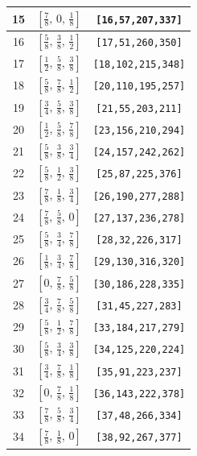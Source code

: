 \documentclass[fleqn,8pt]{jsarticle}
\begin{document}
\begin{longtable}{ccc}
15 & $\left[ \frac{7}{8},\, 0,\, \frac{1}{8} \right]$ & {\tt [16,57,207,337]} \\ \hline
16 & $\left[ \frac{5}{8},\, \frac{3}{8},\, \frac{1}{2} \right]$ & {\tt [17,51,260,350]} \\ \hline
17 & $\left[ \frac{1}{2},\, \frac{5}{8},\, \frac{3}{8} \right]$ & {\tt [18,102,215,348]} \\ \hline
18 & $\left[ \frac{5}{8},\, \frac{7}{8},\, \frac{1}{2} \right]$ & {\tt [20,110,195,257]} \\ \hline
19 & $\left[ \frac{3}{4},\, \frac{5}{8},\, \frac{3}{8} \right]$ & {\tt [21,55,203,211]} \\ \hline
20 & $\left[ \frac{1}{2},\, \frac{5}{8},\, \frac{7}{8} \right]$ & {\tt [23,156,210,294]} \\ \hline
21 & $\left[ \frac{5}{8},\, \frac{3}{8},\, \frac{3}{4} \right]$ & {\tt [24,157,242,262]} \\ \hline
22 & $\left[ \frac{5}{8},\, \frac{1}{2},\, \frac{3}{8} \right]$ & {\tt [25,87,225,376]} \\ \hline
23 & $\left[ \frac{7}{8},\, \frac{1}{8},\, \frac{3}{4} \right]$ & {\tt [26,190,277,288]} \\ \hline
24 & $\left[ \frac{7}{8},\, \frac{5}{8},\, 0 \right]$ & {\tt [27,137,236,278]} \\ \hline
25 & $\left[ \frac{5}{8},\, \frac{3}{4},\, \frac{7}{8} \right]$ & {\tt [28,32,226,317]} \\ \hline
26 & $\left[ \frac{1}{8},\, \frac{3}{4},\, \frac{7}{8} \right]$ & {\tt [29,130,316,320]} \\ \hline
27 & $\left[ 0,\, \frac{7}{8},\, \frac{5}{8} \right]$ & {\tt [30,186,228,335]} \\ \hline
28 & $\left[ \frac{3}{4},\, \frac{7}{8},\, \frac{5}{8} \right]$ & {\tt [31,45,227,283]} \\ \hline
29 & $\left[ \frac{5}{8},\, \frac{1}{2},\, \frac{7}{8} \right]$ & {\tt [33,184,217,279]} \\ \hline
30 & $\left[ \frac{5}{8},\, \frac{3}{4},\, \frac{3}{8} \right]$ & {\tt [34,125,220,224]} \\ \hline
31 & $\left[ \frac{3}{4},\, \frac{7}{8},\, \frac{1}{8} \right]$ & {\tt [35,91,223,237]} \\ \hline
32 & $\left[ 0,\, \frac{7}{8},\, \frac{1}{8} \right]$ & {\tt [36,143,222,378]} \\ \hline
33 & $\left[ \frac{7}{8},\, \frac{5}{8},\, \frac{3}{4} \right]$ & {\tt [37,48,266,334]} \\ \hline
34 & $\left[ \frac{7}{8},\, \frac{1}{8},\, 0 \right]$ & {\tt [38,92,267,377]} \\ \hline

\end{longtable}
\end{document}
